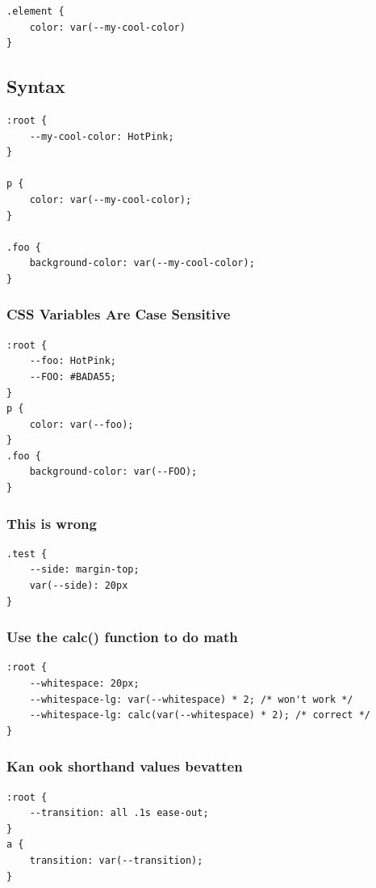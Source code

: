 \documentclass{article}
\begin{document}
\begin{verbatim}
.element {
    color: var(--my-cool-color)
}
\end{verbatim}

\subsection{Syntax}

\begin{verbatim}
:root {
    --my-cool-color: HotPink;
}

p {
    color: var(--my-cool-color);
}

.foo {
    background-color: var(--my-cool-color);
}
\end{verbatim}

\subsubsection{CSS Variables Are Case Sensitive}

\begin{verbatim}
:root {
    --foo: HotPink;
    --FOO: #BADA55;
}
p {
    color: var(--foo);
}
.foo {
    background-color: var(--FOO);
}
\end{verbatim}


\subsubsection{This is wrong}

\begin{verbatim}
.test {
    --side: margin-top;
    var(--side): 20px
}
\end{verbatim}

\subsubsection{Use the calc() function to do math}

\begin{verbatim}
:root {
    --whitespace: 20px;
    --whitespace-lg: var(--whitespace) * 2; /* won't work */
    --whitespace-lg: calc(var(--whitespace) * 2); /* correct */
}
\end{verbatim}

\subsubsection{Kan ook shorthand values bevatten}

\begin{verbatim}
:root {
    --transition: all .1s ease-out;
}
a {
    transition: var(--transition);
}   
\end{verbatim}
\end{document}
